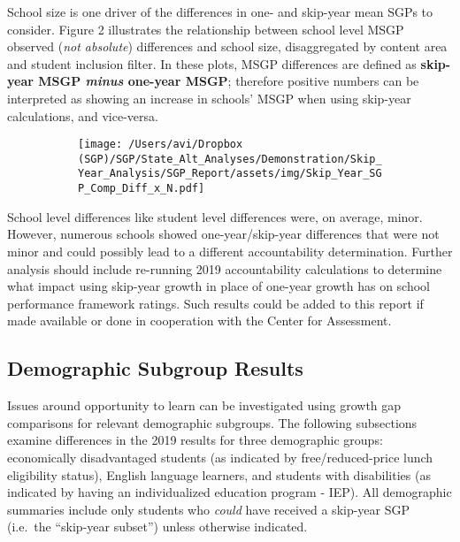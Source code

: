 \documentclass[12pt]{article}
\begin{document}
School size is one driver of the differences in one- and skip-year mean
SGPs to consider. Figure 2 illustrates the relationship between school
level MSGP observed (\emph{not absolute}) differences and school size,
disaggregated by content area and student inclusion filter. In these
plots, MSGP differences are defined as \textbf{skip-year MSGP
\emph{minus} one-year MSGP}; therefore positive numbers can be
interpreted as showing an increase in schools' MSGP when using skip-year
calculations, and vice-versa.

\begin{figure}[H]
\caption*{{{\bf{Figure 2:}} } Mean SGP differences by content area and student inclusion filter}
  \begin{subfigure}[b]{1\textwidth}
    \texttt{[image: /Users/avi/Dropbox (SGP)/SGP/State\_Alt\_Analyses/Demonstration/Skip\_Year\_Analysis/SGP\_Report/assets/img/Skip\_Year\_SGP\_Comp\_Diff\_x\_N.pdf]}
  \end{subfigure}
\end{figure}

School level differences like student level differences were, on
average, minor. However, numerous schools showed one-year/skip-year
differences that were not minor and could possibly lead to a different
accountability determination. Further analysis should include re-running
2019 accountability calculations to determine what impact using
skip-year growth in place of one-year growth has on school performance
framework ratings. Such results could be added to this report if made
available or done in cooperation with the Center for Assessment.

\pagebreak

\hypertarget{demographic-subgroup-results}{%
\subsection{Demographic Subgroup
Results}\label{demographic-subgroup-results}}

Issues around opportunity to learn can be investigated using growth gap
comparisons for relevant demographic subgroups. The following
subsections examine differences in the 2019 results for three
demographic groups: economically disadvantaged students (as indicated by
free/reduced-price lunch eligibility status), English language learners,
and students with disabilities (as indicated by having an individualized
education program - IEP). All demographic summaries include only
students who \emph{could} have received a skip-year SGP (i.e.~the
``skip-year subset'') unless otherwise indicated.
\end{document}
